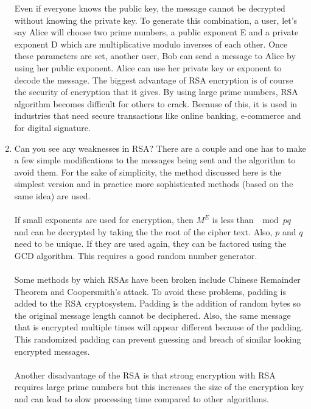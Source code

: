 \documentclass[]{article}
\begin{document}
\begin{enumerate}
\begin{enumerate}
    \end{enumerate}
    Even if everyone knows the public key, the message cannot be decrypted without knowing the private key. To generate this combination, a user, let’s say Alice will choose two prime numbers, a public exponent E and a private exponent D which are multiplicative modulo inverses of each other. Once these parameters are set, another user, Bob can send a message to Alice by using her public exponent.  Alice can use her private key or exponent to decode the message. 
    The biggest advantage of RSA encryption is of course the security of encryption that it gives. By using large prime numbers, RSA algorithm becomes difficult for others to crack. Because of this, it is used in industries that need secure transactions like online banking, e-commerce and for digital signature.
    \item  Can you see any weaknesses in RSA? There are a couple and one has to make a few simple modifications to the messages being sent and the algorithm to avoid them. For the sake of simplicity, the method discussed here is the simplest version and in practice more sophisticated methods (based on the same idea) are used.
    \\\\If small exponents are used for encryption, then $M^E$ is less than $\mod pq$ and can be decrypted by taking the the root of the cipher text. Also, $p$ and $q$ need to be unique. If they are used again, they can be factored using the GCD algorithm. This requires a good random number generator.
    \\\\Some methods by which RSAs have been broken include Chinese Remainder Theorem  and Coopersmith’s attack. To avoid these problems, padding is added to the RSA cryptosystem. Padding is the addition of random bytes so the original message length cannot be deciphered. Also, the same message that is encrypted multiple times will appear different because of the padding. This randomized padding can prevent guessing and breach of similar looking encrypted messages. \\\\Another disadvantage of the RSA is that strong encryption with RSA requires large prime numbers but this increases the size of the encryption key and can lead to slow processing time compared to other algorithms.




    
\end{enumerate}
\end{document}
